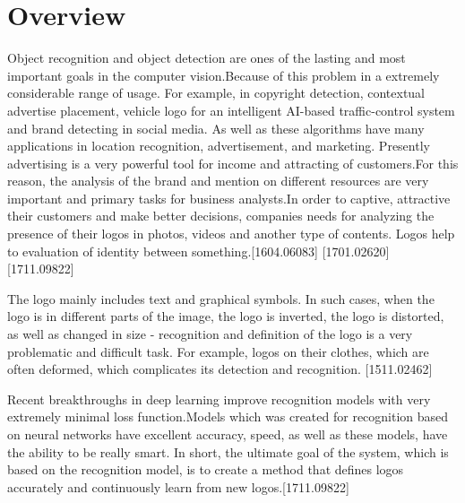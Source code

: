 \section{Overview} \label{sec:1.1}
\vspace{-0.5cm}

\par Object recognition and object detection are ones of the lasting and most important goals in the computer vision.Because of this problem in a extremely considerable range of usage. For example, in copyright detection, contextual advertise placement, vehicle logo for an intelligent AI-based traffic-control system and brand detecting in social media. As well as these algorithms have many applications in location recognition, advertisement, and marketing. Presently advertising is a very powerful tool for income and attracting of customers.For this reason, the analysis of the brand and mention on different resources are very important and primary tasks for business analysts.In order to captive, attractive their customers and make better decisions, companies needs for analyzing the presence of their logos in photos, videos and another type of contents. Logos help to evaluation of identity between something.[1604.06083] [1701.02620] [1711.09822]

\vspace{-0.5cm}
\par The logo mainly includes text and graphical symbols. In such cases, when the logo is in different parts of the image, the logo is inverted, the logo is distorted, as well as changed in size - recognition and definition of the logo is a very problematic and difficult task. For example, logos on their clothes, which are often deformed, which complicates its detection and recognition. [1511.02462]

\vspace{-0.5cm}
\par Recent breakthroughs in deep learning improve recognition models with very extremely minimal loss function.Models which was created for recognition based on neural networks have excellent accuracy, speed, as well as these models, have the ability to be really smart. In short, the ultimate goal of the system, which is based on the recognition model, is to create a method that defines logos accurately and continuously learn from new logos.[1711.09822]

\vspace{-0.3cm}
